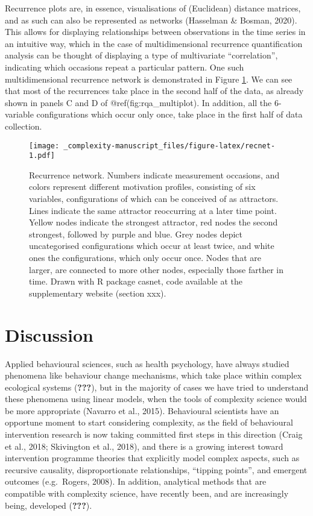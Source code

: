 \documentclass[
  british,
  man,floatsintext]{apa6}
\begin{document}
Recurrence plots are, in essence, visualisations of (Euclidean) distance matrices, and as such can also be represented as networks (Hasselman \& Bosman, 2020). This allows for displaying relationships between observations in the time series in an intuitive way, which in the case of multidimensional recurrence quantification analysis can be thought of displaying a type of multivariate \enquote{correlation}, indicating which occasions repeat a particular pattern. One such multidimensional recurrence network is demonstrated in Figure \ref{fig:recnet}. We can see that most of the recurrences take place in the second half of the data, as already shown in panels C and D of @ref(fig:rqa\_multiplot). In addition, all the 6-variable configurations which occur only once, take place in the first half of data collection.

\begin{figure}
\centering
\texttt{[image: \_complexity-manuscript\_files/figure-latex/recnet-1.pdf]}
\caption{\label{fig:recnet}Recurrence network. Numbers indicate measurement occasions, and colors represent different motivation profiles, consisting of six variables, configurations of which can be conceived of as attractors. Lines indicate the same attractor reoccurring at a later time point. Yellow nodes indicate the strongest attractor, red nodes the second strongest, followed by purple and blue. Grey nodes depict uncategorised configurations which occur at least twice, and white ones the configurations, which only occur once. Nodes that are larger, are connected to more other nodes, especially those farther in time. Drawn with R package casnet, code available at the supplementary website (section xxx).}
\end{figure}

\hypertarget{discussion}{%
\section{Discussion}\label{discussion}}

Applied behavioural sciences, such as health psychology, have always studied phenomena like behaviour change mechanisms, which take place within complex ecological systems ({\textbf{???}}), but in the majority of cases we have tried to understand these phenomena using linear models, when the tools of complexity science would be more appropriate (Navarro et al., 2015). Behavioural scientists have an opportune moment to start considering complexity, as the field of behavioural intervention research is now taking committed first steps in this direction (Craig et al., 2018; Skivington et al., 2018), and there is a growing interest toward intervention programme theories that explicitly model complex aspects, such as recursive causality, disproportionate relationships, \enquote{tipping points}, and emergent outcomes (e.g.~Rogers, 2008). In addition, analytical methods that are compatible with complexity science, have recently been, and are increasingly being, developed ({\textbf{???}}).
\end{document}
